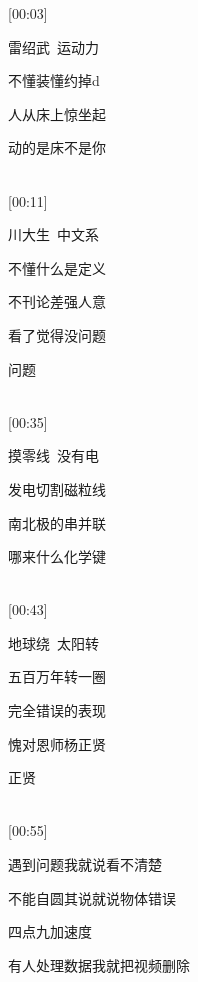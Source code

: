 \documentclass[UTF8,12pt,oneside]{ctexbook}
\begin{document}
        \begin{center}
            [00:03]
            
            雷绍武\ 运动力
            
            不懂装懂约掉d
            
            人从床上惊坐起
            
            动的是床不是你
            
            ~\\
            
            [00:11]
            
            川大生\ 中文系
            
            不懂什么是定义
            
            不刊论差强人意
            
            看了觉得没问题
            
            问题
            
            ~\\
            
            [00:35]
            
            摸零线\ 没有电
            
            发电切割磁粒线
            
            南北极的串并联
            
            哪来什么化学键
            
            ~\\
            
            [00:43]
            
            地球绕\ 太阳转
            
            五百万年转一圈
            
            完全错误的表现
            
            愧对恩师杨正贤
            
            正贤
            
            ~\\
            
            [00:55]
            
            遇到问题我就说看不清楚
            
            不能自圆其说就说物体错误
            
            四点九加速度
            
            有人处理数据我就把视频删除
            

\end{center}
\end{document}
